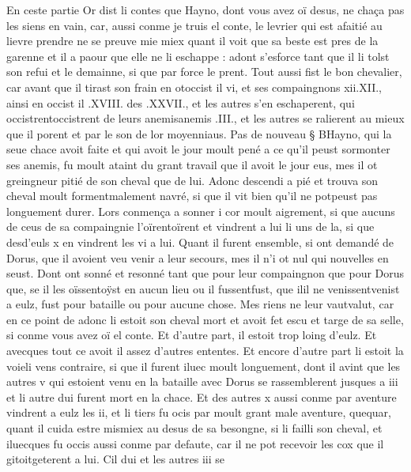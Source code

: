 \documentclass{article}
\begin{document}
\begin{pages}
            
\pstart En ceste partie
   Or dist li contes que 
   Hayno, dont vous avez oï desus, ne chaça pas les siens en vain, car, 
   aussi conme je truis el conte, le levrier qui est afaitié 
   au lievre prendre ne se preuve mie miex quant il voit que sa beste est pres de la garenne 
   et il a paour que elle ne li eschappe : adont s’esforce tant que il li tolst son refui et le demainne, si que par force le prent. 
   Tout aussi fist le bon chevalier, car avant que il tirast son frain en 
   otoccist il vi, 
   et ses compaingnons xii.XII., ainsi en occist il .XVIII. des .XXVII., 
   et les autres s’en eschaperent, qui occistrentoccistrent de leurs 
   anemisanemis .III., et les autres se ralierent au mieux 
   que il porent et par le son de lor moyenniaus. \pend
\pstart Pas de nouveau § BHayno, 
   qui la seue chace avoit faite et qui avoit le jour moult pené a ce qu’il peust sormonter ses anemis, fu moult ataint du grant travail 
   que il avoit le jour eus, mes il ot greingneur pitié de son cheval que de lui. Adonc descendi a pié et trouva son cheval moult 
   formentmalement navré, si que il vit bien qu’il ne 
   potpeust pas longuement durer. Lors conmença a sonner i cor 
   moult aigrement, si que aucuns de ceus de sa compaingnie l’oïrentoïrent et vindrent
      a lui li uns de la, si que desd'euls x 
   en vindrent les vi a lui. Quant il furent ensemble, si ont 
   demandé de Dorus, que il avoient veu venir a leur secours, mes il n’i ot nul qui nouvelles 
   en seust. Dont ont sonné et resonné tant que pour leur compaingnon 
   que pour Dorus que, se il les 
   oïssentoÿst en aucun lieu ou il 
   fussentfust, que 
   ilil ne 
   venissentvenist a eulz, fust pour bataille ou pour aucune chose. 
   Mes riens ne leur vautvalut, car en ce point de adonc li estoit son cheval mort et avoit fet escu et targe de sa selle, 
   si conme vous avez oï el conte. Et d’autre part, il estoit trop loing d’eulz. Et avecques tout ce avoit il 
   assez d’autres ententes. Et encore d’autre part li estoit la voieli vens 
   contraire, si que il furent iluec moult longuement, dont il avint que les autres v qui estoient venu en la bataille avec 
   Dorus se rassemblerent jusques a iii et li autre dui furent mort en la chace. Et des autres
   x aussi conme par aventure vindrent a eulz les ii, et li tiers fu ocis par moult grant male aventure, 
   quequar, quant il cuida estre 
   mismiex au desus de sa besongne, si li failli son cheval, et iluecques 
   fu occis aussi conme par defaute, car il ne pot recevoir les cox que il 
   gitoitgeterent a lui. \pend
\pstart Cil dui et les autres iii se 

\end{pages}
\end{document}
